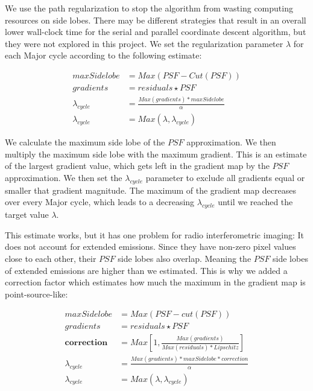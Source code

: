 We use the path regularization to stop the algorithm from wasting computing resources on side lobes. There may be different strategies that result in an overall lower wall-clock time for the serial and parallel coordinate descent algorithm, but they were not explored in this project. We set the regularization parameter $\lambda$ for each Major cycle according to the following estimate:

\begin{equation}
\begin{split}
maxSidelobe &= Max(PSF - Cut(PSF)) \\
gradients &= residuals \star PSF \\
\lambda_{cycle} &= \frac{Max(gradients) * maxSidelobe}{\alpha}\\
\lambda_{cycle} &= Max(\lambda, \lambda_{cycle})
\end{split}
\end{equation}

We calculate the maximum side lobe of the $PSF$ approximation. We then multiply the maximum side lobe with the maximum gradient. This is an estimate of the largest gradient value, which gets left in the gradient map by the $PSF$ approximation. We then set the $\lambda_{cycle}$ parameter to exclude all gradients equal or smaller that gradient magnitude. The maximum of the gradient map decreases over every Major cycle, which leads to a decreasing $\lambda_{cycle}$ until we reached the target value $\lambda$.

This estimate works, but it has one problem for radio interferometric imaging: It does not account for extended emissions. Since they have non-zero pixel values close to each other, their $PSF$ side lobes also overlap. Meaning the $PSF$ side lobes of extended emissions are higher than we estimated. This is why we added a correction factor which estimates how much the maximum in the gradient map is point-source-like:

\begin{equation}
\begin{split}
maxSidelobe &= Max(PSF - cut(PSF)) \\
gradients &= residuals \star PSF \\
\textbf{correction} &= Max \left [1, \frac{Max(gradients)}{Max(residuals) * Lipschitz} \right ] \\
\lambda_{cycle} &= \frac{ Max(gradients) * maxSidelobe * correction}{\alpha}\\
\lambda_{cycle} &= Max(\lambda, \lambda_{cycle})
\end{split}
\end{equation}

